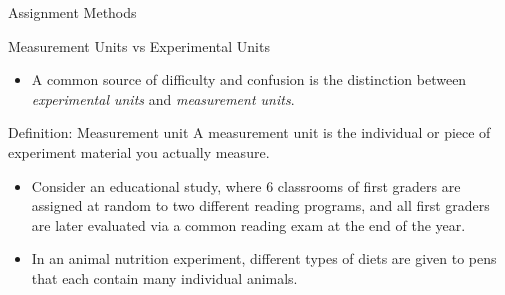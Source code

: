 \begin{frame}[allowframebreaks]{Assignment Methods}
  
\end{frame}

\begin{frame}[allowframebreaks]{Measurement Units vs Experimental Units}
  
  \begin{itemize}
    \item A common source of difficulty and confusion is the distinction between \emph{experimental units} and \emph{measurement units}.
  \end{itemize}
  
  \begin{block}{Definition: Measurement unit}
    A measurement unit is the individual or piece of experiment material you actually measure.
  \end{block}
  
  
  \begin{itemize}
    \item Consider an educational study, where 6 classrooms of first graders are assigned at random to two different reading programs, and all first graders are later evaluated via a common reading exam at the end of the year.
    
    
      \framebreak
    
    \item In an animal nutrition experiment, different types of diets are given to pens that each contain many individual animals.
    

  \end{itemize}
  
\end{frame}

